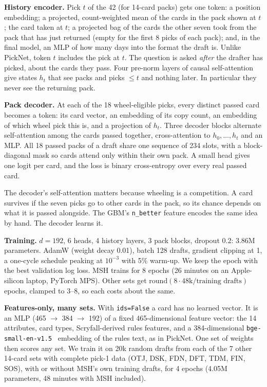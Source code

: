 \documentclass[10pt,letterpaper]{article}
\begin{document}
\textbf{History encoder.} Pick $t$ of the 42 (for 14-card packs) gets one token: a position embedding; a
projected, count-weighted mean of the cards in the pack shown at $t$; the card taken at $t$; a projected bag of
the cards the other seven took from the pack that has just returned (empty for the first 8 picks of each pack);
and, in the final model, an MLP of how many days into the format the draft is. Unlike PickNet, token $t$
includes the pick at $t$. The question is asked \emph{after} the drafter has picked, about the cards they pass.
Four pre-norm layers of causal self-attention give states $h_t$ that see packs and picks $\le t$ and nothing
later. In particular they never see the returning pack.

\textbf{Pack decoder.} At each of the 18 wheel-eligible picks, every distinct passed card becomes a token: its
card vector, an embedding of its copy count, an embedding of which wheel pick this is, and a projection of $h_t$.
Three decoder blocks alternate self-attention among the cards passed together, cross-attention to $h_0,\dots,h_t$
and an MLP. All 18 passed packs of a draft share one sequence of 234 slots, with a block-diagonal mask so
cards attend only within their own pack. A small head gives one logit per card, and the loss is binary
cross-entropy over every real passed card.

The decoder's self-attention matters because wheeling is a competition. A card survives if the seven picks go
to other cards in the pack, so its chance depends on what it is passed alongside. The GBM's \texttt{n\_better}
feature encodes the same idea by hand. The decoder learns it.

\textbf{Training.} $d=192$, 6 heads, 4 history layers, 3 pack blocks, dropout 0.2: 3.86M parameters. AdamW (weight
decay 0.01), batch 128 drafts, gradient clipping at 1, a one-cycle schedule peaking at $10^{-3}$ with 5\% warm-up.
We keep the epoch with the best validation log loss. MSH trains for 8 epochs (26 minutes on an Apple-silicon
laptop, PyTorch MPS). Other sets get $\mathrm{round}(8 \cdot 48\text{k} / \text{training drafts})$ epochs, clamped to
3--8, so each costs about the same.

\textbf{Features-only, many sets.} With \texttt{ids=False} a card has no learned vector. It is an MLP
(465 $\to$ 384 $\to$ 192) of a fixed 465-dimensional feature vector: the 14 attributes, card types,
Scryfall-derived rules features, and a 384-dimensional \texttt{bge-small-en-v1.5}~\cite{bge} embedding of
the rules text, as in PickNet. One set of weights then scores any set. We train it on 20k random drafts from
each of the 7 other 14-card sets with complete pick-1 data (OTJ, DSK, FDN, DFT, TDM, FIN, SOS), with or without
MSH's own training drafts, for 4 epochs (4.05M parameters, 48 minutes with MSH included).
\end{document}
